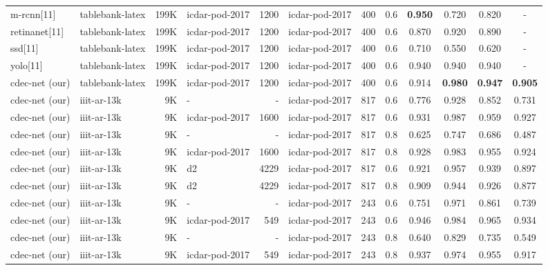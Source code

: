 \documentclass[a4paper,conference]{IEEEtran}
\begin{document}
\begin{table*}[ht!]
\begin{center}
\begin{tabular}{|l| l | r|l |r|l|r| c| c c c c|}
{\sc m-rcnn}[11] &{\sc t}able{\sc b}ank-{\sc l}a{\sc t}e{\sc x} &199K &{\sc icdar-pod}-2017 &1200 &{\sc icdar-pod}-2017 &400 &0.6 &\textbf{0.950} &0.720 &0.820 &- \\ 
{\sc r}etina{\sc n}et[11]&{\sc t}able{\sc b}ank-{\sc l}a{\sc t}e{\sc x} &199K &{\sc icdar-pod}-2017 &1200 &{\sc icdar-pod}-2017 &400 &0.6 &0.870 &0.920 &0.890 &- \\ 
{\sc ssd}[11]&{\sc t}able{\sc b}ank-{\sc l}a{\sc t}e{\sc x} &199K &{\sc icdar-pod}-2017 &1200 &{\sc icdar-pod}-2017 &400 &0.6 &0.710 &0.550 &0.620 &- \\ 
{\sc yolo}[11] &{\sc t}able{\sc b}ank-{\sc l}a{\sc t}e{\sc x} &199K &{\sc icdar-pod}-2017 &1200 &{\sc icdar-pod}-2017 &400 &0.6 &0.940 &0.940 &0.940 &- \\ 
{\sc cd}e{\sc c-n}et (our) &{\sc t}able{\sc b}ank-{\sc l}a{\sc t}e{\sc x} &199K &{\sc icdar-pod}-2017 &1200 &{\sc icdar-pod}-2017 &400 &0.6 &0.914 &\textbf{0.980} &\textbf{0.947} &\textbf{0.905} \\ \hhline{|=|=|=|=|=|=|=|=|====|} 
{\sc cd}e{\sc c-n}et (our) &{\sc iiit-ar-13k} &9K &-  &-  &{\sc icdar-pod}-2017 &817 &0.6 &0.776 &0.928 &0.852 &0.731 \\ 
{\sc cd}e{\sc c-n}et (our) &{\sc iiit-ar-13k} &9K &{\sc icdar-pod}-2017 &1600 &{\sc icdar-pod}-2017 &817 &0.6 &0.931 &0.987 &0.959 &0.927 \\
{\sc cd}e{\sc c-n}et (our) &{\sc iiit-ar-13k} &9K &-  &-  &{\sc icdar-pod}-2017 &817 &0.8 &0.625 &0.747 &0.686 &0.487 \\ 
{\sc cd}e{\sc c-n}et (our) &{\sc iiit-ar-13k} &9K &{\sc icdar-pod}-2017 &1600 &{\sc icdar-pod}-2017 &817 &0.8 &0.928 &0.983 &0.955 &0.924 \\
{\sc cd}e{\sc c-n}et (our) &{\sc iiit-ar-13k} &9K &{\sc d}2 &4229 &{\sc icdar-pod}-2017 &817 &0.6 &0.921 &0.957 &0.939 &0.897 \\ 
{\sc cd}e{\sc c-n}et (our) &{\sc iiit-ar-13k} &9K &{\sc d}2 &4229 &{\sc icdar-pod}-2017 &817 &0.8 &0.909 &0.944 &0.926 &0.877 \\
{\sc cd}e{\sc c-n}et (our) &{\sc iiit-ar-13k} &9K &- & -&{\sc icdar-pod}-2017 &243 &0.6 &0.751 &0.971 &0.861 &0.739 \\
{\sc cd}e{\sc c-n}et (our) &{\sc iiit-ar-13k} &9K &{\sc icdar-pod}-2017 &549 &{\sc icdar-pod}-2017 &243 &0.6 &0.946 &0.984 &0.965 &0.934 \\
{\sc cd}e{\sc c-n}et (our) &{\sc iiit-ar-13k} &9K &- & -&{\sc icdar-pod}-2017 &243 &0.8 &0.640 &0.829 &0.735 &0.549 \\
{\sc cd}e{\sc c-n}et (our) &{\sc iiit-ar-13k} &9K &{\sc icdar-pod}-2017 &549 &{\sc icdar-pod}-2017 &243 &0.8 &0.937 &0.974 &0.955 &0.917 \\

\end{tabular}
\end{center}
\end{table*}
\end{document}
